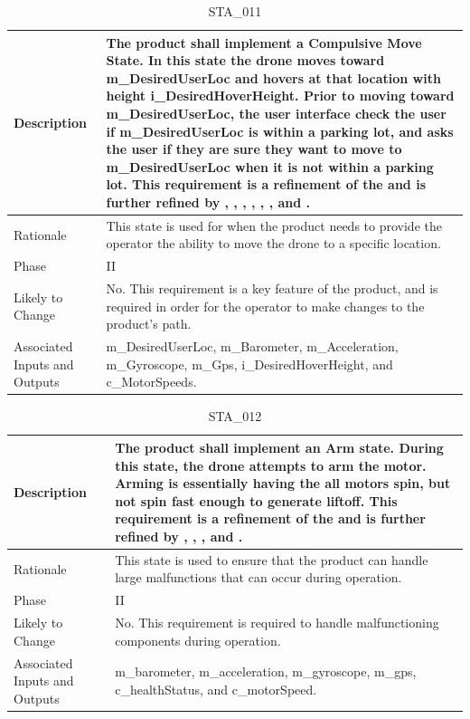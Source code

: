 \documentclass{article}
\begin{document}
\begin{table}[!h]
\begin{center}
\caption {STA\_011} 
\label{STA_011}
\begin{tabular}{ | m{3cm} | m{11cm} | }
\hline
Description & The product shall implement a Compulsive Move State. In this state the drone moves toward m\_DesiredUserLoc and hovers at that location with height i\_DesiredHoverHeight. Prior to moving toward m\_DesiredUserLoc, the user interface check the user if m\_DesiredUserLoc is within a parking lot, and asks the user if they are sure they want to move to m\_DesiredUserLoc when it is not within a parking lot. This requirement is a refinement of the \nameref{Compulsive Move State} and is further refined by \nameref{PERF_003}, \nameref{PERF_004}, \nameref{PERF_006}, \nameref{PERF_007}, \nameref{SAFE_001}, \nameref{SAFE_003}, \nameref{PERF_008} and \nameref{USE_003}. \\
\hline
Rationale & This state is used for when the product needs to provide the operator the ability to move the drone to a specific location. \\
\hline
Phase & II \\
\hline
Likely to Change & No. This requirement is a key feature of the product, and is required in order for the operator to make changes to the product's path. \\
\hline
Associated Inputs and Outputs & m\_DesiredUserLoc, m\_Barometer, m\_Acceleration, m\_Gyroscope, m\_Gps, i\_DesiredHoverHeight, and c\_MotorSpeeds. \\
\hline
\end{tabular}
\end{center}
\end{table}


\begin{table}[!h]
\begin{center}
\caption {STA\_012} 
\label{STA_012}
\begin{tabular}{ | m{3cm} | m{11cm} | }
\hline
Description & The product shall implement an Arm state. During this state, the drone attempts to arm the motor. Arming is essentially having the all motors spin, but not spin fast enough to generate liftoff. This requirement is a refinement of the \nameref{Arm State} and is further refined by \nameref{PERF_007}, \nameref{SAFE_001}, \nameref{SAFE_003}, and \nameref{USE_003}. \\
\hline
Rationale & This state is used to ensure that the product can handle large malfunctions that can occur during operation. \\
\hline
Phase & II \\
\hline
Likely to Change & No. This requirement is required to handle malfunctioning components during operation. \\
\hline
Associated Inputs and Outputs & m\_barometer, m\_acceleration, m\_gyroscope, m\_gps, c\_healthStatus, and c\_motorSpeed. \\
\hline
\end{tabular}
\end{center}
\end{table}
\end{document}
